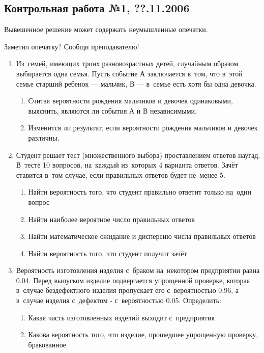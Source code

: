 \subsection{Контрольная работа №1, ??.11.2006}

Вывешенное решение может содержать неумышленные опечатки.

Заметил опечатку? Сообщи преподавателю!

\begin{enumerate}
\item  Из~семей, имеющих троих разновозрастных детей, случайным
образом выбирается одна семья. Пусть событие А заключается в~том,
что в~этой семье
старший ребенок — мальчик, В — в~семье есть хотя бы одна девочка.
\begin{enumerate}
\item Считая вероятности рождения мальчиков и девочек одинаковыми,
выяснить, являются ли события А и В независимыми.
\item Изменится ли результат, если вероятности рождения мальчиков и
девочек различны.
\end{enumerate}
\item Студент решает тест (множественного выбора) проставлением
ответов наугад. В~тесте 10 вопросов, на~каждый из~которых 4
варианта ответов. Зачёт ставится в~том случае, если правильных
ответов будет не~менее 5.
\begin{enumerate}
\item Найти вероятность того, что студент правильно ответит только
на~один вопрос
\item Найти наиболее вероятное число правильных ответов
\item Найти математическое ожидание и дисперсию числа правильных
ответов
\item Найти вероятность того, что студент получит зачёт
\end{enumerate}

\item Вероятность изготовления изделия с~браком на~некотором
предприятии равна 0.04. Перед выпуском изделие подвергается
упрощенной проверке, которая в~случае бездефектного изделия
пропускает его с~вероятностью 0.96, а в~случае изделия с~дефектом
- с~вероятностью 0.05. Определить:
\begin{enumerate}
\item Какая часть изготовленных изделий выходит с~предприятия
\item Какова вероятность того, что изделие, прошедшее упрощенную
проверку, бракованное
\end{enumerate}


\end{enumerate}
